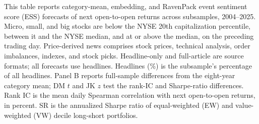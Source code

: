 \begin{table}[htbp]
\centering
\caption{Signal Performance by Subsample}
\label{tab:tabA_subsamples}
\begin{minipage}{\linewidth}\footnotesize
This table reports category-mean, embedding, and RavenPack event sentiment score (ESS) forecasts of next open-to-open returns across subsamples, 2004--2025. Micro, small, and big stocks are below the NYSE 20th capitalization percentile, between it and the NYSE median, and at or above the median, on the preceding trading day. Price-derived news comprises stock prices, technical analysis, order imbalances, indexes, and stock picks. Headline-only and full-article are source formats; all forecasts use headlines. Headlines (\%) is the subsample's percentage of all headlines. Panel B reports full-sample differences from the eight-year category mean; DM $t$ and JK $z$ test the rank-IC and Sharpe-ratio differences. Rank IC is the mean daily Spearman correlation with next open-to-open returns, in percent. SR is the annualized Sharpe ratio of equal-weighted (EW) and value-weighted (VW) decile long-short portfolios.
\end{minipage}
\medskip


\end{table}
